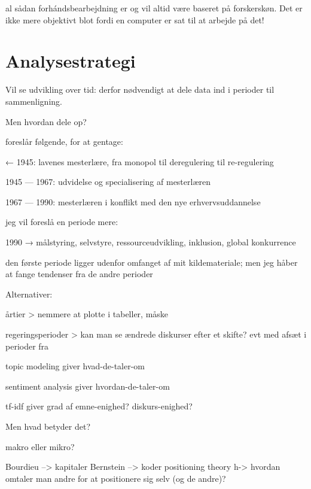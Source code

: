 al sådan forhándsbearbejdning er og vil altid være baseret på forskerskøn.
Det er ikke mere objektivt blot fordi en computer er sat til at arbejde på det!

\chapter{Analysestrategi}\label{chap:strategy}

Vil se udvikling over tid: derfor nødvendigt at dele data ind i perioder til sammenligning.

Men hvordan dele op?

\citeauthor{bondergaardHistoricalEmergenceKey2014} foreslår følgende, for at gentage:

← 1945: lavenes mesterlære, fra monopol til deregulering til re-regulering

1945 — 1967: udvidelse og specialisering af mesterlæren

1967 — 1990: mesterlæren i konflikt med den nye erhvervsuddannelse

jeg vil foreslå en periode mere:

1990 → målstyring, selvstyre, ressourceudvikling, inklusion, global konkurrence 

den første periode ligger udenfor omfanget af mit kildemateriale; men jeg håber at fange tendenser fra de andre perioder

Alternativer:

årtier > nemmere at plotte i tabeller, måske

regeringsperioder > kan man se ændrede diskurser efter et skifte? evt med afsæt i perioder fra \citeauthor{bondergaardHistoricalEmergenceKey2014, juulDiskurserOmUngdom2013}



topic modeling giver hvad-de-taler-om

sentiment analysis giver hvordan-de-taler-om

tf-idf giver grad af emne-enighed? diskurs-enighed?

Men hvad betyder det?

makro eller mikro?

Bourdieu --> kapitaler
Bernstein --> koder
positioning theory h-> hvordan omtaler man andre for at positionere sig selv (og de andre)?
